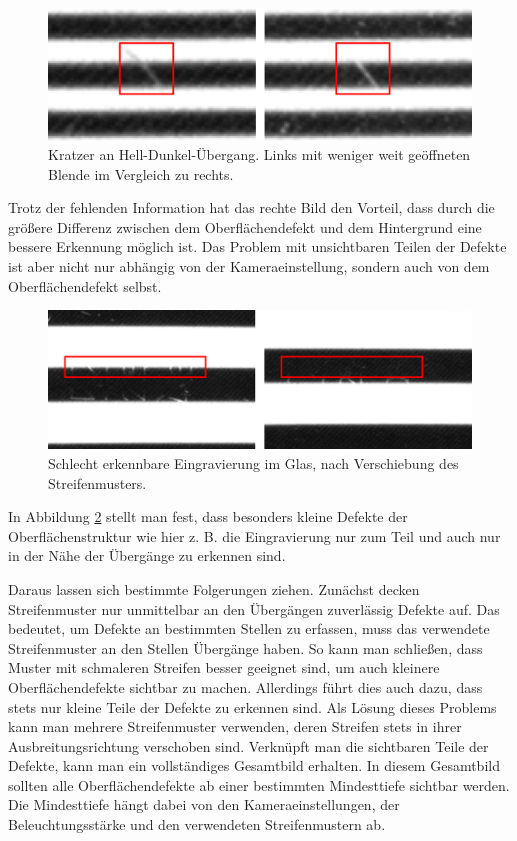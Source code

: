\begin{figure}[H]
	\centering
	\includegraphics[width=\textwidth]{03_sichtpruefungDurchLichtreflexionen/verfahren/figures/visibleScratch}
	\caption[Kratzer]{Kratzer an Hell-Dunkel-Übergang. Links mit weniger weit geöffneten Blende im Vergleich zu rechts.}
	\label{img:scratches}
\end{figure}

\noindent
Trotz der fehlenden Information hat das rechte Bild den Vorteil, dass durch die größere Differenz zwischen dem Oberflächendefekt und dem Hintergrund eine bessere Erkennung möglich ist.
Das Problem mit unsichtbaren Teilen der Defekte ist aber nicht nur abhängig von der Kameraeinstellung, sondern auch von dem Oberflächendefekt selbst.

\begin{figure}[H]
	\centering
	\includegraphics[width=\textwidth]{03_sichtpruefungDurchLichtreflexionen/verfahren/figures/minorScratch}
	\caption[Eingravierung im Glas]{Schlecht erkennbare Eingravierung im Glas, nach Verschiebung des Streifenmusters.}
	\label{img:engraving}
\end{figure}

\noindent
In Abbildung \ref{img:engraving} stellt man fest, dass besonders kleine Defekte der Oberflächenstruktur wie hier z. B. die Eingravierung nur zum Teil und auch nur in der Nähe der Übergänge zu erkennen sind.

\p
Daraus lassen sich bestimmte Folgerungen ziehen.
Zunächst decken Streifenmuster nur unmittelbar an den Übergängen zuverlässig Defekte auf.
Das bedeutet, um Defekte an bestimmten Stellen zu erfassen, muss das verwendete Streifenmuster an den Stellen Übergän\-ge haben.
So kann man schließen, dass Muster mit schmaleren Streifen besser geeignet sind, um auch kleinere Oberflächendefekte sichtbar zu machen.
Allerdings führt dies auch dazu, dass stets nur kleine Teile der Defekte zu erkennen sind.
Als Lösung dieses Problems kann man mehrere Streifenmuster verwenden, deren Streifen stets in ihrer Ausbreitungsrichtung verschoben sind.
Verknüpft man die sichtbaren Teile der Defekte, kann man ein vollständiges Gesamtbild erhalten.
In diesem Gesamtbild sollten alle Oberflächendefekte ab einer bestimmten Mindesttiefe sichtbar werden.
Die Mindesttiefe hängt dabei von den Kameraeinstellungen, der Beleuchtungsstärke und den verwendeten Streifenmustern ab.